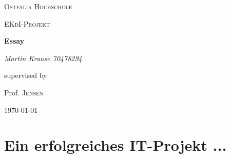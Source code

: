\documentclass[12pt]{scrartcl}
\begin{document}
\begin{titlepage}
	\centering
	{\scshape\LARGE Ostfalia Hochschule \par}
	\vspace{1cm}
	{\scshape\Large EKdI-Projekt\par}
	\vspace{1.5cm}
	{\huge\bfseries Essay\par}
	\vspace{2cm}
	{\Large\itshape Martin Krause 70478294\par}
	\vfill
	supervised by\par
	Prof. \textsc{Jensen}

	\vfill

	{\large \today\par}
\end{titlepage}



\section{Ein erfolgreiches IT-Projekt ...}
\end{document}

